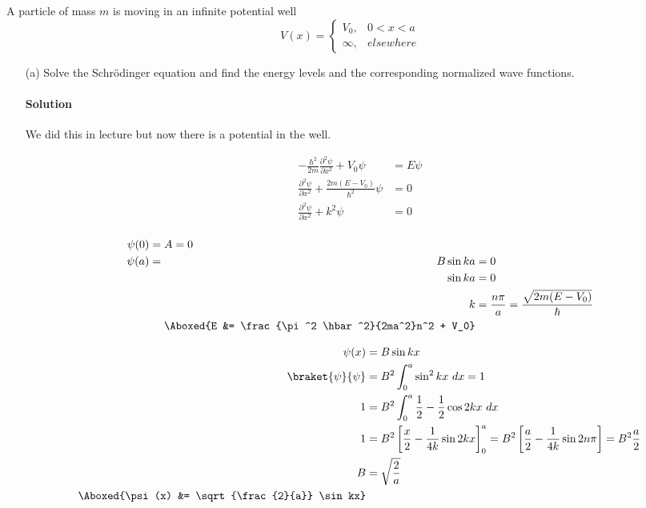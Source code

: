 \documentclass{article}
\begin{document}
	A particle of mass $m$ is moving in an infinite potential well
	\begin{equation}
		V(x) = \begin{cases}
			V_0, & 0 < x < a \\
			\infty, & elsewhere
		\end{cases} \label{eq:2}
	\end{equation}
	\begin{enumerate}
		\item[(a)] Solve the Schrödinger equation and find the energy levels and the corresponding normalized wave functions.
		\paragraph{Solution} We did this in lecture but now there is a potential in the well.
		
		\begin{equation}
			\begin{split}
				-\frac{\hbar^2}{2m} \frac{\partial^2 \psi}{\partial x^2} + V_0 \psi &= E\psi \\
				\frac{\partial^2 \psi}{\partial x^2} + \frac{2m(E-V_0)}{\hbar^2} \psi &= 0 \\
				\frac{\partial^2 \psi}{\partial x^2} + k^2 \psi &= 0 \\
			\end{split}
		\end{equation}
		
		\begin{equation}
			\begin{split}
				\psi(0) &= A = 0 \\
				\psi(a) &= \begin{aligned}[t] 
					B \sin ka &= 0 \\
					\sin ka &= 0 \\
					k &= \frac{n\pi}{a} = \frac{\sqrt{2m(E-V_0)}}{\hbar} \\
					\Aboxed{E &= \frac{\pi^2 \hbar^2}{2ma^2}n^2 + V_0}
				\end{aligned}
			\end{split}
		\end{equation}
		
		\begin{equation}
			\begin{split}
				\psi(x) &= B \sin kx \\
				\braket{\psi}{\psi} &= B^2 \int_{0}^{a} \sin^2 kx \ dx = 1 \\
				1 &= B^2 \int_{0}^{a} \frac{1}{2} - \frac{1}{2} \cos 2kx \ dx \\
				1 &= B^2 \left[ \frac{x}{2} - \frac{1}{4k} \sin 2kx \right]^a_0 = B^2 \left[ \frac{a}{2} - \frac{1}{4k} \sin 2n\pi \right] = B^2 \frac{a}{2} \\
				B &= \sqrt{\frac{2}{a}} \\
				\Aboxed{\psi(x) &= \sqrt{\frac{2}{a}} \sin kx} \\
			\end{split}
		\end{equation}
		

\end{enumerate}
\end{document}
